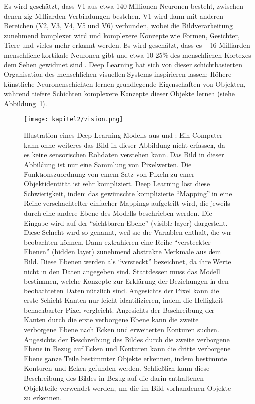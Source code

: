 Es wird geschätzt, dass V1 aus etwa 140 Millionen Neuronen besteht, zwischen denen zig Milliarden Verbindungen bestehen. V1 wird dann mit anderen Bereichen (V2, V3, V4, V5 und V6) verbunden, wobei die Bildverarbeitung zunehmend komplexer wird und komplexere Konzepte wie Formen, Gesichter, Tiere und vieles mehr erkannt werden. Es wird geschätzt, dass es ~ 16 Milliarden menschliche kortikale Neuronen gibt und etwa 10-25\% des menschlichen Kortexes dem Sehen gewidmet sind \cite{Herculano-Houzel2009}. Deep Learning hat sich von dieser schichtbasierten Organisation des menschlichen visuellen Systems inspirieren lassen: Höhere künstliche Neuronenschichten lernen grundlegende Eigenschaften von Objekten, während tiefere Schichten komplexere Konzepte dieser Objekte lernen (siehe Abbildung~\ref{Kap2:Vison}).

\begin{figure}[H]
  \centering
  \texttt{[image: kapitel2/vision.png]}
  \caption[Illustration eines Deep-Learning-Modells]{Illustration eines Deep-Learning-Modells aus \cite{IanGoodfellowYoshuaBengio2016} und \cite{Suah2017}: Ein Computer kann ohne weiteres das Bild in dieser Abbildung nicht erfassen, da es keine sensorischen Rohdaten verstehen kann. Das Bild in dieser Abbildung ist nur eine Sammlung von Pixelwerten. Die Funktionszuordnung von einem Satz von Pixeln zu einer Objektidentität ist sehr kompliziert.  Deep Learning löst diese Schwierigkeit, indem das gewünschte komplizierte \enquote{Mapping} in eine Reihe verschachtelter einfacher Mappings aufgeteilt wird, die jeweils durch eine andere Ebene des Modells beschrieben werden. Die Eingabe wird auf der \enquote{sichtbaren Ebene} (visible layer) dargestellt. Diese Schicht wird so genannt, weil sie die Variablen enthält, die wir beobachten können. Dann extrahieren eine Reihe \enquote{versteckter Ebenen} (hidden layer) zunehmend abstrakte Merkmale aus dem Bild. Diese Ebenen werden als \enquote{versteckt} bezeichnet, da ihre Werte nicht in den Daten angegeben sind. Stattdessen muss das Modell bestimmen, welche Konzepte zur Erklärung der Beziehungen in den beobachteten Daten nützlich sind. Angesichts der Pixel kann die erste Schicht Kanten nur leicht identifizieren, indem die Helligkeit benachbarter Pixel vergleicht. Angesichts der Beschreibung der Kanten durch die erste verborgene Ebene kann die zweite verborgene Ebene nach Ecken und erweiterten Konturen suchen. Angesichts der Beschreibung des Bildes durch die zweite verborgene Ebene in Bezug auf Ecken und Konturen kann die dritte verborgene Ebene ganze Teile bestimmter Objekte erkennen, indem bestimmte Konturen und Ecken gefunden werden. Schließlich kann diese Beschreibung des Bildes in Bezug auf die darin enthaltenen Objektteile verwendet werden, um die im Bild vorhandenen Objekte zu erkennen.}
  \label{Kap2:Vison}
\end{figure}


